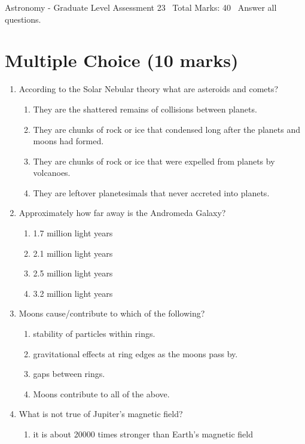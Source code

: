\documentclass[12pt]{article}
\begin{document}
\begin{center}
Astronomy - Graduate Level Assessment 23 \
Total Marks: 40 \
Answer all questions.
\end{center}

\section*{Multiple Choice (10 marks)}
\begin{enumerate}[label=\arabic*.]
\item According to the Solar Nebular theory what are asteroids and comets?
\begin{enumerate}[label=(\alph*)]
    \item They are the shattered remains of collisions between planets.
    \item They are chunks of rock or ice that condensed long after the planets and moons had formed.
    \item They are chunks of rock or ice that were expelled from planets by volcanoes.
    \item They are leftover planetesimals that never accreted into planets.
\end{enumerate}
\item Approximately how far away is the Andromeda Galaxy?
\begin{enumerate}[label=(\alph*)]
    \item 1.7 million light years
    \item 2.1 million light years
    \item 2.5 million light years
    \item 3.2 million light years
\end{enumerate}
\item Moons cause/contribute to which of the following?
\begin{enumerate}[label=(\alph*)]
    \item stability of particles within rings.
    \item gravitational effects at ring edges as the moons pass by.
    \item gaps between rings.
    \item Moons contribute to all of the above.
\end{enumerate}
\item What is not true of Jupiter's magnetic field?
\begin{enumerate}[label=(\alph*)]
    \item it is about 20000 times stronger than Earth's magnetic field

\end{enumerate}
\end{enumerate}
\end{document}
